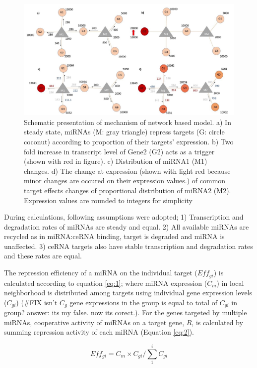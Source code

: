\documentclass[a4,center,fleqn]{NAR}
\begin{document}
\begin{figure}
\hypertarget{fig1}{%
\centering
\includegraphics{Fig1.jpg}
\caption{Schematic presentation of mechanism of network based model. a)
In steady state, miRNAs (M: gray triangle) repress targets (G: circle
coconut) according to proportion of their targets' expression. b) Two
fold increase in transcript level of Gene2 (G2) acts as a trigger (shown
with red in figure). c) Distribution of miRNA1 (M1) changes. d) The
change at expression (shown with light red because minor changes are
occured on their expression values.) of common target effects changes of
proportional distribution of miRNA2 (M2). Expression values are rounded
to integers for simplicity}\label{fig1}
}
\end{figure}

During calculations, following assumptions were adopted; 1)
Transcription and degradation rates of miRNAs are steady and equal. 2)
All available miRNAs are recycled as in miRNA:ceRNA binding, target is
degraded and miRNA is unaffected. 3) ceRNA targets also have stable
transcription and degradation rates and these rates are equal.

The repression efficiency of a miRNA on the individual target
(\(Eff_{gi}\)) is calculated according to equation \eqref{eq:1}; where
miRNA expression (\(C_m\)) in local neighborhood is distributed among
targets using individual gene expression levels (\(C_{gi}\)) (\#FIX
isn't \(C_g\) gene expressions in the group is equal to total of
\(C_{gi}\) in group? answer: its my false. now its corect.). For the
genes targeted by multiple miRNAs, cooperative activity of miRNAs on a
target gene, \(R\), is calculated by summing repression activity of each
miRNA (Equation \eqref{eq:2}).

\begin{equation} 
    Eff_{gi}= C_m \times C_{gi}/\sum_{1}^{i} C_{gi} \tag{1}\label{eq:1}
\end{equation}
\end{document}
